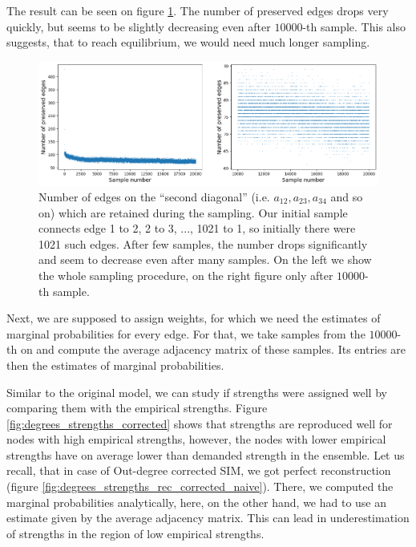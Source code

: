 The result can be seen on figure \ref*{fig:second_diagonal}. The number of preserved edges drops very quickly, but seems to be slightly decreasing even after $10\mathpunct{}000$-th sample. This also suggests, that to reach equilibrium, we would need much longer sampling. 

\begin{figure}[!ht]
    \centering
    \includegraphics[scale=0.5]{../img/metropolis/second_diagonal.png}
    \caption{Number of edges on the ``second diagonal'' (i.e. $a_{12}, a_{23}, a_{34}$ and so on) which are retained during the sampling. Our initial sample connects edge 1 to 2, 2 to 3, ..., 1021 to 1, so initially there were 1021 such edges. After few samples, the number drops significantly and seem to decrease even after many samples. On the left we show the whole sampling procedure, on the right figure only after $10\mathpunct{}000$-th sample.}
    \label{fig:second_diagonal}
\end{figure}

Next, we are supposed to assign weights, for which we need the estimates of marginal probabilities for every edge. For that, we take samples from the $10\mathpunct{}000$-th on and compute the average adjacency matrix of these samples. Its entries are then the estimates of marginal probabilities. 

Similar to the original model, we can study if strengths were assigned well by comparing them with the empirical strengths. Figure \ref*{fig:degrees_strengths_corrected} shows that strengths are reproduced well for nodes with high empirical strengths, however, the nodes with lower empirical strengths have on average lower than demanded strength in the ensemble. Let us recall, that in case of Out-degree corrected SIM, we got perfect reconstruction (figure \ref*{fig:degrees_strengths_rec_corrected_naive}). There, we computed the marginal probabilities analytically, here, on the other hand, we had to use an estimate given by the average adjacency matrix. This can lead in underestimation of strengths in the region of low empirical strengths. 

